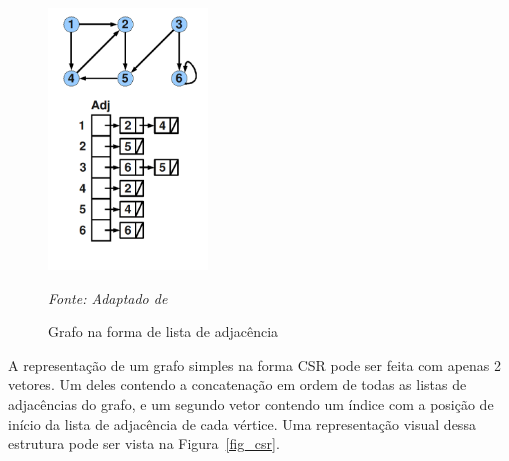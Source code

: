 \begin{figure}[h]
\centering
\includegraphics[width=10pc]{./imagens/adj-list-2.png}
\caption{Grafo na forma de lista de adjacência}
\label{fig_adj}
\textit{Fonte: Adaptado de \cite{nonato2000}}
\end{figure}

A representação de um grafo simples na forma CSR pode ser feita com apenas 2 vetores. Um deles contendo a concatenação em ordem de todas as listas de adjacências do grafo, e um segundo vetor contendo um índice com a posição de início da lista de adjacência de cada vértice. Uma representação visual dessa estrutura pode ser vista na Figura~\ref{fig_csr}.


